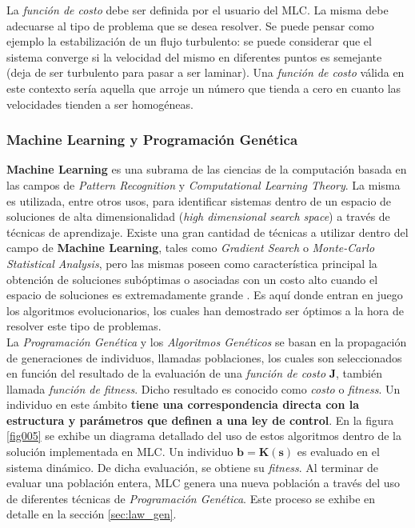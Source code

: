 \documentclass[a4paper,10pt]{article}
\begin{document}
        \indent La \textit{función de costo} debe ser definida por el usuario del MLC. La misma debe adecuarse al tipo de problema que se 
        desea resolver. Se puede pensar como ejemplo la estabilización de un flujo turbulento: se puede considerar que el sistema converge 
        si la velocidad del mismo en diferentes puntos es semejante (deja de ser turbulento para pasar a ser laminar). Una 
        \textit{función de costo} válida en este contexto sería aquella que arroje un número que tienda a cero en cuanto las velocidades 
        tienden a ser homogéneas.
        

    \subsubsection{Machine Learning y Programación Genética} \label{sec:mlc_and_gp}
        \textbf{Machine Learning} es una subrama de las ciencias de la computación basada en las campos de \textit{Pattern Recognition} y
        \textit{Computational Learning Theory}. La misma es utilizada, entre otros usos, para identificar sistemas dentro de un espacio de
        soluciones de alta dimensionalidad (\textit{high dimensional search space}) a través de técnicas de aprendizaje. Existe una gran
        cantidad de técnicas a utilizar dentro del campo de \textbf{Machine Learning}, tales como \textit{Gradient Search} o
        \textit{Monte-Carlo Statistical Analysis}, pero las mismas poseen como característica principal la obtención de soluciones
        subóptimas o asociadas con un costo alto cuando el espacio de soluciones es extremadamente grande \cite{Duriez2016}. Es aquí
        donde entran en juego los algoritmos
        evolucionarios, los cuales han demostrado ser óptimos a la hora de resolver este tipo de problemas. \\

        \indent La \textit{Programación Genética} y los \textit{Algoritmos Genéticos} se basan en la propagación de generaciones de
        individuos, llamadas poblaciones, los cuales son seleccionados en función del resultado de la evaluación de una 
        \textit{función de costo} \textbf{J}, también llamada \textit{función de fitness}. Dicho resultado es conocido como \textit{costo}
        o \textit{fitness}. 
        Un individuo en este ámbito \textbf{tiene una correspondencia directa con la estructura y parámetros que definen
        a una ley de control}. En la figura \ref{fig005} se exhibe un diagrama detallado del uso de estos algoritmos dentro de la solución
        implementada en MLC. Un individuo $\mathbf{b = K(s)}$ es evaluado en el sistema dinámico. De dicha evaluación, se obtiene su
        \textit{fitness}. Al terminar de evaluar una población entera, MLC genera una nueva población a través del uso de
        diferentes técnicas de \textit{Programación Genética}. Este proceso se exhibe en detalle en la sección \ref{sec:law_gen}. \\
\end{document}
